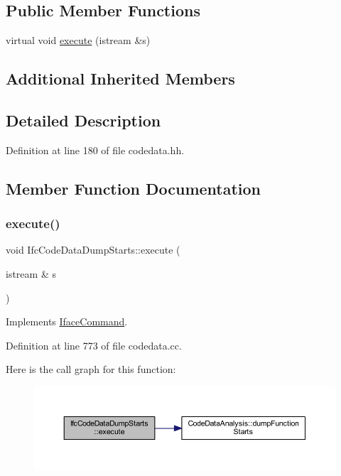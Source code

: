 \subsection*{Public Member Functions}
\begin{DoxyCompactItemize}
\item 
virtual void \mbox{\hyperlink{class_ifc_code_data_dump_starts_a580e0d5282d8338455f02dcb5368e0dc}{execute}} (istream \&s)
\end{DoxyCompactItemize}
\subsection*{Additional Inherited Members}


\subsection{Detailed Description}


Definition at line 180 of file codedata.\+hh.



\subsection{Member Function Documentation}
\mbox{\label{class_ifc_code_data_dump_starts_a580e0d5282d8338455f02dcb5368e0dc}} 
\subsubsection{\texorpdfstring{execute()}{execute()}}
{\footnotesize\ttfamily void Ifc\+Code\+Data\+Dump\+Starts\+::execute (\begin{DoxyParamCaption}\item[{istream \&}]{s }\end{DoxyParamCaption})\hspace{0.3cm}{\ttfamily [virtual]}}



Implements \mbox{\hyperlink{class_iface_command_af10e29cee2c8e419de6efe9e680ad201}{Iface\+Command}}.



Definition at line 773 of file codedata.\+cc.

Here is the call graph for this function\+:
\nopagebreak
\begin{figure}[H]
\begin{center}
\leavevmode
\includegraphics[width=350pt]{class_ifc_code_data_dump_starts_a580e0d5282d8338455f02dcb5368e0dc_cgraph}
\end{center}
\end{figure}


